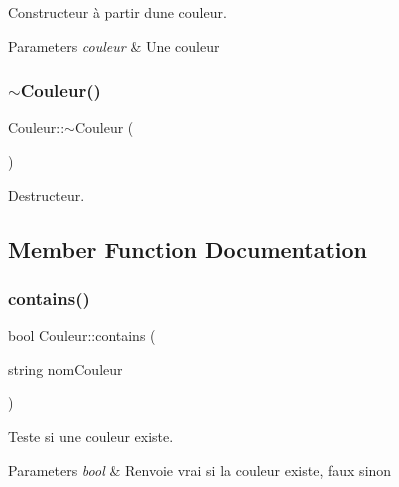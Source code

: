 Constructeur à partir d\textquotesingle{}une couleur. 


\begin{DoxyParams}{Parameters}
{\em couleur} & Une couleur \\
\hline
\end{DoxyParams}
\mbox{\label{class_couleur_ad3be30be83649bc5db48ef46b592aec2}} 
\subsubsection{\texorpdfstring{$\sim$\+Couleur()}{~Couleur()}}
{\footnotesize\ttfamily Couleur\+::$\sim$\+Couleur (\begin{DoxyParamCaption}{ }\end{DoxyParamCaption})\hspace{0.3cm}{\ttfamily [virtual]}}



Destructeur. 



\subsection{Member Function Documentation}
\mbox{\label{class_couleur_ab426fe44e27a92cf0faf8fee1e086a5f}} 
\subsubsection{\texorpdfstring{contains()}{contains()}}
{\footnotesize\ttfamily bool Couleur\+::contains (\begin{DoxyParamCaption}\item[{string}]{nom\+Couleur }\end{DoxyParamCaption})}



Teste si une couleur existe. 


\begin{DoxyParams}{Parameters}
{\em bool} & Renvoie vrai si la couleur existe, faux sinon \\
\hline
\end{DoxyParams}
\mbox{\label{class_couleur_a0e38cc8477e1618b317124ab372c3501}} 
